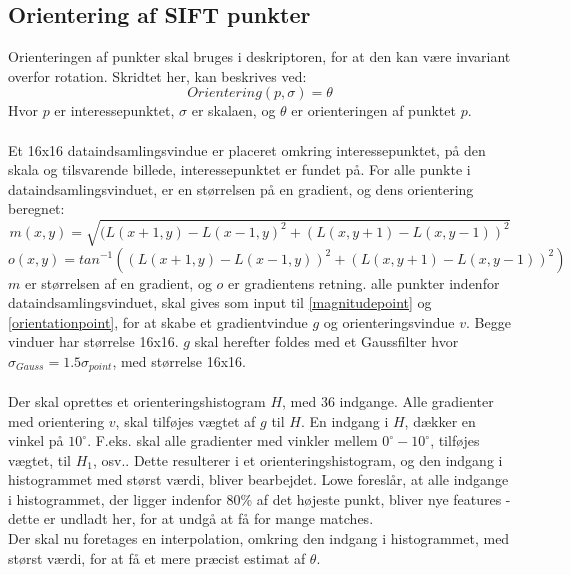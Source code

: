 \subsection{Orientering af SIFT punkter}
Orienteringen af punkter skal bruges i deskriptoren, for at den kan være invariant overfor rotation. Skridtet her, kan beskrives ved:
\begin{equation}
Orientering(p, \sigma) = \theta
\end{equation}
Hvor $p$ er interessepunktet, $\sigma$ er skalaen, og $\theta$ er orienteringen af punktet $p$. 
\\
\\
Et 16x16 dataindsamlingsvindue er placeret omkring interessepunktet, på den skala og tilsvarende billede, interessepunktet er fundet på. For alle punkte i dataindsamlingsvinduet, er en størrelsen på en gradient, og dens orientering beregnet:
\begin{equation}
m(x,y) = \sqrt{(L(x + 1, y) - L(x - 1, y)^2 + (L(x, y + 1) - L(x, y - 1))^2  } 
\label{magnitudepoint}
\end{equation}
\begin{equation}
o(x,y) = tan^{-1}((L(x + 1, y) - L(x - 1, y))^2 + (L(x, y + 1) - L(x, y - 1))^2 ) 
\label{orientationpoint}
\end{equation}
$m$ er størrelsen af en gradient, og $o$ er gradientens retning. alle punkter indenfor dataindsamlingsvinduet, skal gives som input til \eqref{magnitudepoint} og \eqref{orientationpoint}, for at skabe et gradientvindue $g$ og orienteringsvindue $v$. Begge vinduer har størrelse 16x16. $g$ skal herefter foldes med et Gaussfilter hvor $\sigma_{Gauss} = 1.5\sigma_{point} $, med størrelse 16x16.
\\
\\
Der skal oprettes et orienteringshistogram $H$, med 36 indgange. Alle gradienter med orientering $v$, skal tilføjes vægtet af $g$ til $H$. En indgang i $H$, dækker en vinkel på $10^{\circ}$. F.eks. skal alle gradienter med vinkler mellem  $0^{\circ}-10^{\circ}$, tilføjes vægtet, til $H_1$, osv.. Dette resulterer i et orienteringshistogram, og den indgang i histogrammet med størst værdi, bliver bearbejdet. Lowe foreslår, at alle indgange i histogrammet, der ligger indenfor 80\% af det højeste punkt, bliver nye features - dette er undladt her, for at undgå at få for mange matches.
\\
Der skal nu foretages en interpolation, omkring den indgang i histogrammet, med størst værdi, for at få et mere præcist estimat af $\theta$.

